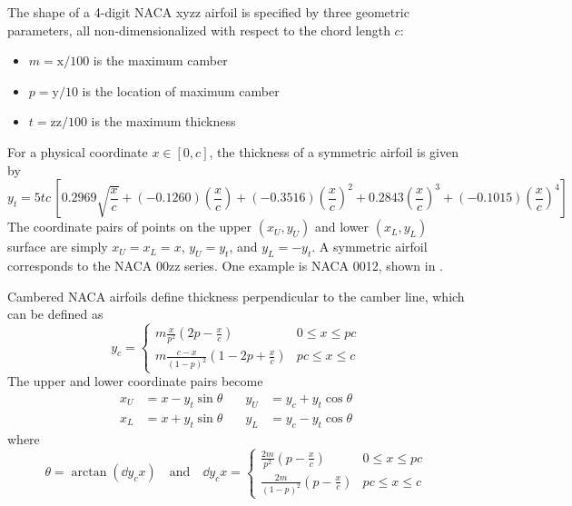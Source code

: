 \documentclass[11pt]{article}
\begin{document}
The shape of a 4-digit NACA xyzz airfoil is specified by three geometric parameters, all non-dimensionalized with respect to the chord length $c$:
\begin{itemize}
\item $m = \text{x} / 100$ is the maximum camber
\item $p = \text{y} / 10$ is the location of maximum camber
\item $t = \text{zz}/100$ is the maximum thickness
\end{itemize}

For a physical coordinate $x \in [0, c]$, the thickness of a symmetric airfoil is given by
\begin{equation}
y_t = 5tc\, \left[ 0.2969 \sqrt{\frac{x}{c}} + (-0.1260) \left(\frac{x}{c}\right) + (-0.3516) \left(\frac{x}{c}\right)^2 + 0.2843 \left(\frac{x}{c}\right)^3 + (-0.1015) \left( \frac{x}{c} \right)^4 \right]
\end{equation}
The coordinate pairs of points on the upper $(x_U, y_U)$ and lower $(x_L, y_L)$ surface are simply $x_U = x_L = x$, $y_U = y_t$, and $y_L = -y_t$. A symmetric airfoil corresponds to the NACA 00zz series. One example is NACA 0012, shown in .

Cambered NACA airfoils define thickness perpendicular to the camber line, which can be defined as
\begin{equation}
y_c = \begin{cases}
m \frac{x}{p^2} \left( 2p-\frac{x}{c}\right) & 0 \le x \le pc \\
m \frac{c-x}{(1-p)^2} \left(1-2p+\frac{x}{c}\right) & pc \le x \le c
\end{cases}
\end{equation}
The upper and lower coordinate pairs become
\begin{equation}
\begin{aligned}
x_U &= x - y_t \sin \theta &\quad y_U &= y_c + y_t \cos \theta \\
x_L &= x + y_t \sin \theta &\quad y_L &= y_c - y_t \cos \theta
\end{aligned}
\end{equation}
where
\begin{equation}
\theta = \arctan \left( \dd{y_c}{x} \right)
\quad \text{and} \quad
\dd{y_c}{x} =
\begin{cases}
\frac{2m}{p^2} \left( p - \frac{x}{c} \right) & 0 \le x \le pc \\
\frac{2m}{(1-p)^2} \left( p - \frac{x}{c} \right) & pc \le x \le c
\end{cases}
\end{equation}
\end{document}
